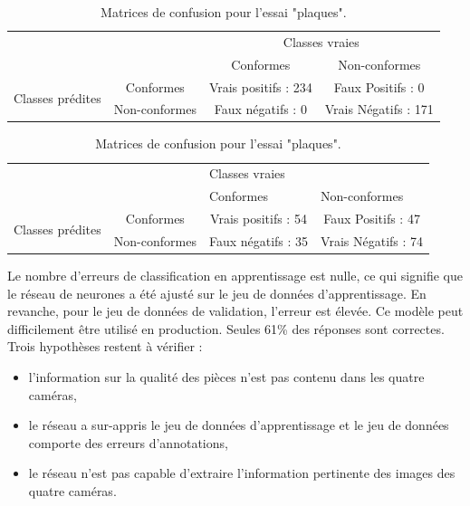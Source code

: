 \begin{table}[!h]
	\centering
	\begin{subtable}{1\textwidth}
		\centering
		\begin{tabular}{c c|c|c|}
			\cline{3-4}
			& & \multicolumn{2}{c|}{Classes vraies}               \\ \cline{3-4}
			& & \multicolumn{1}{c|}{Conformes} & \multicolumn{1}{c|}{Non-conformes} \\ \hline
			\multicolumn{1}{|c|}{\multirow{2}{*}{Classes prédites}} & Conformes & Vrais positifs : 234 & Faux Positifs : 0 \\ \cline{2-4} 
			\multicolumn{1}{|c|}{} & Non-conformes & Faux négatifs : 0  & Vrais Négatifs : 171 \\ \hline
		\end{tabular}
		\caption{Jeu de données d'apprentissage.}
	\end{subtable}
	
	\bigskip
	
	\begin{subtable}{1\textwidth}
		\centering
		\begin{tabular}{l c|c|c|}
			\cline{3-4}
			& & \multicolumn{2}{l|}{Classes vraies}               \\ \cline{3-4}
			& & \multicolumn{1}{l|}{Conformes} & \multicolumn{1}{l|}{Non-conformes} \\ \hline
			\multicolumn{1}{|l|}{\multirow{2}{*}{Classes prédites}} & Conformes & Vrais positifs : 54 & Faux Positifs : 47 \\ \cline{2-4} 
			\multicolumn{1}{|l|}{} & Non-conformes & Faux négatifs : 35  & Vrais Négatifs : 74 \\ \hline
		\end{tabular}
		\caption{Jeu de données de validation.}
	\end{subtable}
	\caption{Matrices de confusion pour l'essai "plaques".}
	\label{tab:po_results}
\end{table}

Le nombre d'erreurs de classification en apprentissage est nulle, ce qui signifie que le réseau de neurones a été ajusté sur le jeu de données d'apprentissage.
En revanche, pour le jeu de données de validation, l'erreur est élevée.
Ce modèle peut difficilement être utilisé en production.
Seules 61\% des réponses sont correctes.
Trois hypothèses restent à vérifier :
\begin{itemize}
	\item l'information sur la qualité des pièces n'est pas contenu dans les quatre caméras,
	\item le réseau a sur-appris le jeu de données d'apprentissage et le jeu de données comporte des erreurs d'annotations,
	\item le réseau n'est pas capable d'extraire l'information pertinente des images des quatre caméras.
\end{itemize}

